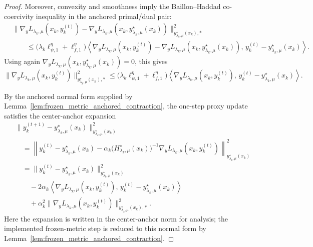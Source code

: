 \documentclass{article}
\begin{document}
\begin{proof}
Moreover, convexity and smoothness imply the Baillon--Haddad co-coercivity inequality in the
anchored primal/dual pair:
\begin{align}
&\|\nabla_yL_{\lambda_k,\mu}(x_k,y_k^{(t)})
-
\nabla_yL_{\lambda_k,\mu}(x_k,y_{\lambda_k,\mu}^\star(x_k))
\|_{y_{\lambda_k,\mu}^\star(x_k),*}^2
\nonumber\\
&\qquad\le
\bigl(\lambda_k\ell_{\psi,1}^\eta+\ell_{f,1}^\eta\bigr)
\left\langle
\nabla_yL_{\lambda_k,\mu}(x_k,y_k^{(t)})
-
\nabla_yL_{\lambda_k,\mu}(x_k,y_{\lambda_k,\mu}^\star(x_k)),
\,y_k^{(t)}-y_{\lambda_k,\mu}^\star(x_k)
\right\rangle .
\label{eq:proxy_tracker_cocoercive}
\end{align}
Using again
\(\nabla_yL_{\lambda_k,\mu}(x_k,y_{\lambda_k,\mu}^\star(x_k))=0\), this gives
\begin{equation}
\label{eq:proxy_tracker_grad_sq}
\|\nabla_yL_{\lambda_k,\mu}(x_k,y_k^{(t)})\|_{y_{\lambda_k,\mu}^\star(x_k),*}^2
\le
\bigl(\lambda_k\ell_{\psi,1}^\eta+\ell_{f,1}^\eta\bigr)
\left\langle
\nabla_yL_{\lambda_k,\mu}(x_k,y_k^{(t)}),
\,y_k^{(t)}-y_{\lambda_k,\mu}^\star(x_k)
\right\rangle .
\end{equation}

By the anchored normal form supplied by
Lemma~\ref{lem:frozen_metric_anchored_contraction}, the one-step proxy update satisfies the
center-anchor expansion
\begin{align*}
&\|y_k^{(t+1)}-y_{\lambda_k,\mu}^\star(x_k)\|_{y_{\lambda_k,\mu}^\star(x_k)}^2 \\
&\quad =
\left\|
y_k^{(t)}-y_{\lambda_k,\mu}^\star(x_k)
-
\alpha_k\bigl(H_{\lambda_k,\mu}^\star(x_k)\bigr)^{-1}
\nabla_yL_{\lambda_k,\mu}(x_k,y_k^{(t)})
\right\|_{y_{\lambda_k,\mu}^\star(x_k)}^2 \\
&\quad =
\|y_k^{(t)}-y_{\lambda_k,\mu}^\star(x_k)\|_{y_{\lambda_k,\mu}^\star(x_k)}^2 \\
&\qquad
-2\alpha_k
\left\langle
\nabla_yL_{\lambda_k,\mu}(x_k,y_k^{(t)}),
\,y_k^{(t)}-y_{\lambda_k,\mu}^\star(x_k)
\right\rangle \\
&\qquad
+\alpha_k^2
\|\nabla_yL_{\lambda_k,\mu}(x_k,y_k^{(t)})\|_{y_{\lambda_k,\mu}^\star(x_k),*}^2 .
\end{align*}
Here the expansion is written in the center-anchor norm for analysis; the implemented frozen-metric
step is reduced to this normal form by Lemma~\ref{lem:frozen_metric_anchored_contraction}.


\end{proof}
\end{document}
